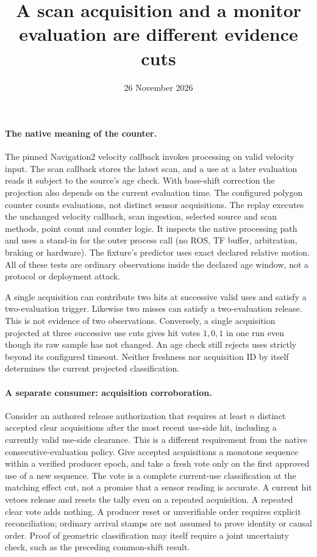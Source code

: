\documentclass[11pt]{article}
\title{A scan acquisition and a monitor evaluation are different evidence cuts}
\date{26 November 2026}
\begin{document}
\maketitle
\paragraph{The native meaning of the counter.}
The pinned Navigation2 velocity callback invokes processing on valid
velocity input. The scan callback stores the latest scan, and a use
at a later evaluation reads it subject to the source's age check.
With base-shift correction the projection also depends on the current
evaluation time. The configured polygon counter counts evaluations,
not distinct sensor acquisitions. The replay executes the unchanged
velocity callback, scan ingestion, selected source and scan methods,
point count and counter logic. It inspects the native processing path
and uses a stand-in for the outer process call (no ROS, TF buffer,
arbitration, braking or hardware). The fixture's predictor uses exact
declared relative motion. All of these tests are ordinary observations
inside the declared age window, not a protocol or deployment attack.

A single acquisition can contribute two hits at successive valid
uses and satisfy a two-evaluation trigger. Likewise two misses can
satisfy a two-evaluation release. This is not evidence of two
observations. Conversely, a single acquisition projected at three
successive use cuts gives hit votes $1,0,1$ in one run even though its
raw sample has not changed. An age check still rejects uses strictly
beyond its configured timeout. Neither freshness nor acquisition ID
by itself determines the current projected classification.

\paragraph{A separate consumer: acquisition corroboration.}
Consider an authored release authorization that requires at least $n$
distinct accepted clear acquisitions after the most recent use-side
hit, including a currently valid use-side clearance. This is a
different requirement from the native consecutive-evaluation policy.
Give accepted acquisitions a monotone sequence within a verified
producer epoch, and take a fresh vote only on the first approved use
of a new sequence. The vote is a complete current-use classification
at the matching effect cut, not a promise that a sensor reading is
accurate. A current hit vetoes release and resets the tally even on
a repeated acquisition. A repeated clear vote adds nothing. A
producer reset or unverifiable order requires explicit reconciliation;
ordinary arrival stamps are not assumed to prove identity or causal
order. Proof of geometric classification may itself require a
joint uncertainty check, such as the preceding common-shift result.
\end{document}
